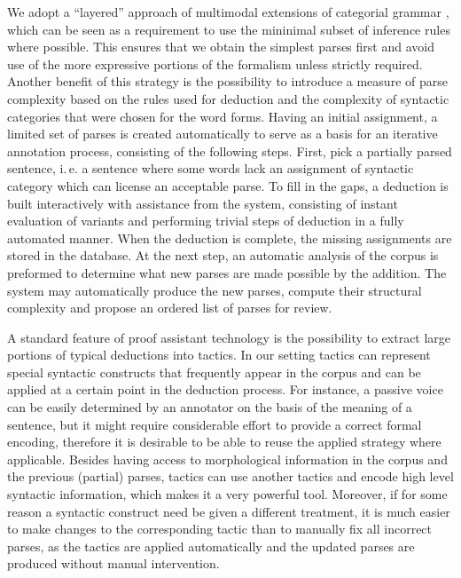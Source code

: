\documentclass[a4paper]{article}
\theoremstyle{example-style}
\begin{document}
We adopt a ``layered'' approach of multimodal extensions of categorial grammar \parencite{morrill1994type,baldridge2003multi}, which can be seen as a requirement to use the mininimal subset of inference rules where possible. This ensures that we obtain the simplest parses first and avoid use of the more expressive portions of the formalism unless strictly required. Another benefit of this strategy is the possibility to introduce a measure of parse complexity based on the rules used for deduction and the complexity of syntactic categories that were chosen for the word forms. Having an initial assignment, a limited set of parses is created automatically to serve as a basis for an iterative annotation process, consisting of the following steps. First, pick a partially parsed sentence, i.\,e. a sentence where some words lack an assignment of syntactic category which can license an acceptable parse. To fill in the gaps, a deduction is built interactively with assistance from the system, consisting of instant evaluation of variants and performing trivial steps of deduction in a fully automated manner. When the deduction is complete, the missing assignments are stored in the database. At the next step, an automatic analysis of the corpus is preformed to determine what new parses are made possible by the addition. The system may automatically produce the new parses, compute their structural complexity and propose an ordered list of parses for review. 

A standard feature of proof assistant technology is the possibility to extract large portions of typical deductions into tactics. In our setting tactics can represent special syntactic constructs that frequently appear in the corpus and can be applied at a certain point in the deduction process. For instance, a passive voice can be easily determined by an annotator on the basis of the meaning of a sentence, but it might require considerable effort to provide a correct formal encoding, therefore it is desirable to be able to reuse the applied strategy where applicable. Besides having access to morphological information in the corpus and the previous (partial) parses, tactics can use another tactics and encode high level syntactic information, which makes it a very powerful tool. Moreover, if for some reason a syntactic construct need be given a different treatment, it is much easier to make changes to the corresponding tactic than to manually fix all incorrect parses, as the tactics are applied automatically and the updated parses are produced without manual intervention.
  
\end{document}
